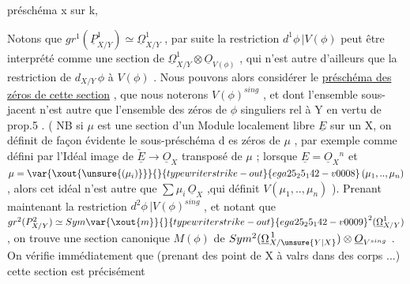 
préschéma x sur k, 

Notons que $gr^1(\underline{P}^1_{X/Y}) \simeq \underline{\Omega}^1_{X/Y}$ , par suite la restriction
$d^1\phi\,|V(\phi)$ peut être interprété comme une section de $\underline{\Omega}^1_{X/Y} \otimes \underline{O}_{V(\phi)}$ ,
qui n'est autre d'ailleurs que la restriction de $d_{X/Y}\,\phi$ à $V(\phi)$ . Nous
pouvons alors considérer le \uline{préschéma des zéros de cette section} , que
nous noterons $V(\phi)^{sing}$ , et dont l'ensemble sous-jacent n'est autre
que l'ensemble des zéros de $\phi$ singuliers rel à Y en vertu de prop.5 .
( NB si  $\mu$ est une section d'un Module localement libre  $\underline{E}$ sur un
  X, on définit de façon évidente le sous-préschéma d es
zéros de $\mu$ , par exemple comme défini par l'Idéal image de $\check{\underline{E}} \longrightarrow \underline{O}_X$
transposé de $\mu$ ; lorsque $\underline{E} = \underline{O}_X{}^n$ et $\mu = \var{\xout{\unsure{(\mu_i)}}}{}{typewriter strike-out}{ega25_25_142-v0008}\,(\mu_1,..,\mu_n)$, alors cet
idéal n'est autre que $\sum \mu_i\,\underline{O}_X$ ,qui définit $V(\mu_1,..,\mu_n)$ ). Prenant
maintenant la restriction $d^2\phi\,|V(\phi)^{sing}$ , et notant que
$gr^2(P^2_{X/Y}) \simeq Sym\var{\xout{m}}{}{typewriter strike-out}{ega25_25_142-v0009}^2(\underline{\Omega}^1_{X/Y})$, on trouve une section canonique $M(\phi)$ de
$Sym^2(\underline{\Omega}^{\,1}_{X/\unsure{Y|X}}) \otimes \underline{O}_{V^{sing}}$ . On vérifie immédiatement que (prenant des
point de X à valrs dans des corps ...) cette section est précisément
